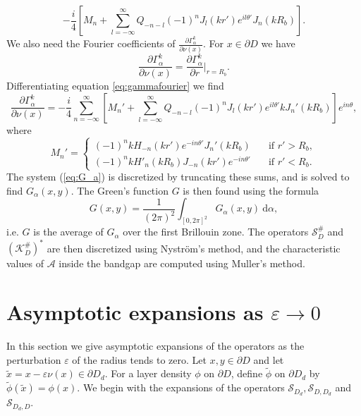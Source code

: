 \documentclass[a4paper]{article}
\theoremstyle{definition}
\newcommand{\A}{\mathcal{A}}
\renewcommand{\S}{\mathcal{S}}
\renewcommand{\epsilon}{\varepsilon}
\newcommand{\dx}{\: \mathrm{d}}
\newcommand{\Scrystal}{\mathcal{S}_D^\#}
\newcommand{\KstarC}{(\mathcal{K}_D^{\#})^*}
\newcommand{\eqnref}[1]{(\ref {#1})}
\begin{document}
\begin{equation*}
-\frac{i}{4}\left[M_n + \sum_{l=-\infty}^\infty Q_{-n-l} (-1)^nJ_l(kr')e^{il\theta'}J_n(kR_b)\right].
\end{equation*}
We also need the Fourier coefficients of $\frac{\partial \Gamma_\alpha^k}{\partial \nu(x)}$.  For $x\in \partial D$ we have
\begin{equation*}
\frac{\partial \Gamma_\alpha^k}{\partial \nu(x)} = \frac{\partial \Gamma_\alpha^k}{\partial r} \Bigg|_{r=R_b}.
\end{equation*} 
Differentiating equation \ref{eq:gammafourier} we find
\begin{equation*}
\frac{\partial \Gamma_\alpha^k}{\partial \nu(x)} = -\frac{i}{4}\sum_{n=-\infty}^\infty\left[ M_n' + \sum_{l=-\infty}^\infty Q_{-n-l} (-1)^nJ_l(kr')e^{il\theta'}kJ_n'(kR_b)\right]e^{in\theta},
\end{equation*}
where
\begin{equation*}
M_n' = \begin{cases}
(-1)^nkH_{-n}(kr')e^{-in\theta'}J_n'(kR_b) \quad &\text{if } r' > R_b, \\
(-1)^nkH'_{n}(kR_b)J_{-n}(kr')e^{-in\theta'} \quad &\text{if } r' < R_b.
\end{cases}
\end{equation*}
The system \eqnref{eq:G_a} is discretized by truncating these sums, and is solved to find $G_\alpha(x,y)$. The Green's function $G$ is then found using the formula
\begin{equation*}
G(x,y) = \frac{1}{(2\pi)^2}\int_{[0,2\pi]^2} G_\alpha(x,y) \dx \alpha,
\end{equation*}
i.e. $G$ is the average of $G_\alpha$ over the first Brillouin zone. The operators $\Scrystal$ and $\KstarC$ are then discretized using Nyström's method, and the characteristic values of $\A$ inside the bandgap are computed using Muller's method. \cite{first}

\section{Asymptotic expansions as $\epsilon \rightarrow 0$}
In this section we give asymptotic expansions of the operators as the perturbation $\epsilon$ of the radius tends to zero. Let $x,y\in \partial D$ and let $\tilde{x} = x - \epsilon \nu(x) \in \partial D_d$. For a layer density $\phi$ on $\partial D$, define $\tilde{\phi}$ on $\partial D_d$ by $\tilde{\phi}(\tilde{x}) = \phi (x)$. We begin with the expansions of the operators $\S_{D_d}, \S_{D,D_d}$ and  $\S_{D_d,D}$. 
\end{document}
